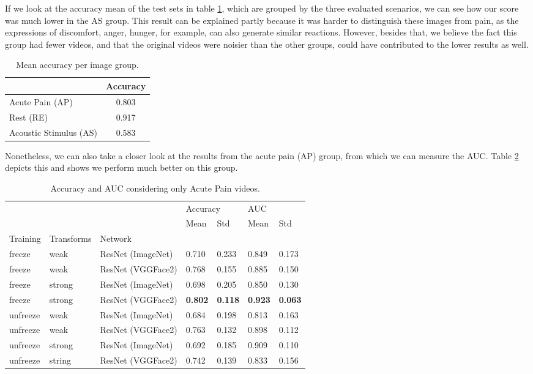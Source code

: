 If we look at the accuracy mean of the test sets in table \ref{tab:mean_accuracy_group}, which are grouped by the three evaluated scenarios, we can see how our score was much lower in the AS group. This result can be explained partly because it was harder to distinguish these images from pain, as the expressions of discomfort, anger, hunger, for example, can also generate similar reactions. However, besides that, we believe the fact this group had fewer videos, and that the original videos were noisier than the other groups, could have contributed to the lower results as well.

\begin{table}[h!tp]
\centering
\caption{Mean accuracy per image group.}
\label{tab:mean_accuracy_group}
\begin{tabular}{lc}
\hline
                       & Accuracy \\ \hline
Acute Pain (AP)        & 0.803    \\
Rest (RE)              & 0.917    \\
Acoustic Stimulus (AS) & 0.583    \\ \hline
\end{tabular}
\end{table}

Nonetheless, we can also take a closer look at the results from the acute pain (AP) group, from which we can measure the AUC. Table \ref{tab:accuracy_auc_ap} depicts this and shows we perform much better on this group.

\begin{table}[h!tp]
\centering
\caption{Accuracy and AUC considering only Acute Pain videos.}
\label{tab:accuracy_auc_ap}
\begin{tabular}{lllllll}
\toprule
         &        &          & \multicolumn{2}{l}{Accuracy} & \multicolumn{2}{l}{AUC} \\
         &        &          &      Mean &       Std &      Mean &       Std \\
Training & Transforms & Network &           &           &           &           \\
\midrule
freeze   & weak   & ResNet (ImageNet) &  0.710 &  0.233 &  0.849 &  0.173 \\
freeze   & weak   & ResNet (VGGFace2) &  0.768 &  0.155 &  0.885 &  0.150 \\
freeze   & strong & ResNet (ImageNet) &  0.698 &  0.205 &  0.850 &  0.130 \\
freeze   & strong & ResNet (VGGFace2) &  \textbf{0.802} & \textbf{ 0.118} &  \textbf{0.923} &  \textbf{0.063} \\
unfreeze & weak   & ResNet (ImageNet) &  0.684 &  0.198 &  0.813 &  0.163 \\
unfreeze & weak   & ResNet (VGGFace2) &  0.763 &  0.132 &  0.898 &  0.112 \\
unfreeze & strong & ResNet (ImageNet) &  0.692 &  0.185 &  0.909 &  0.110 \\
unfreeze & string & ResNet (VGGFace2) &  0.742 &  0.139 &  0.833 &  0.156 \\
\bottomrule
\end{tabular}
\end{table}

